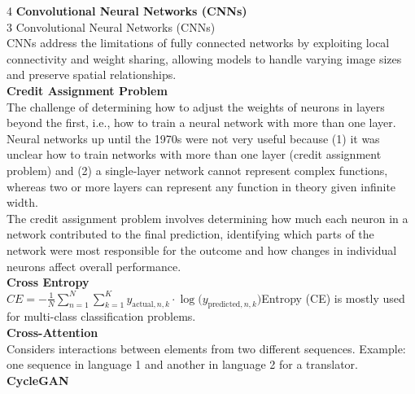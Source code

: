 \documentclass[8pt]{extarticle}
\begin{document}
\begin{multicols}{4}
\vspace{2pt}\textbf{Convolutional Neural Networks (CNNs)}\\
3 Convolutional Neural Networks (CNNs)\\
CNNs address the limitations of fully connected networks by exploiting local connectivity and weight sharing, allowing models to handle varying image sizes and preserve spatial relationships.\\
\vspace{2pt}\textbf{Credit Assignment Problem}\\
The challenge of determining how to adjust the weights of neurons in layers beyond the first, i.e., how to train a neural network with more than one layer.\\
Neural networks up until the 1970s were not very useful because (1) it was unclear how to train networks with more than one layer (credit assignment problem) and (2) a single-layer network cannot represent complex functions, whereas two or more layers can represent any function in theory given infinite width.\\
The credit assignment problem involves determining how much each neuron in a network contributed to the final prediction, identifying which parts of the network were most responsible for the outcome and how changes in individual neurons affect overall performance.\\
\vspace{2pt}\textbf{Cross Entropy}\\
$CE = -\frac{1}{N} \sum_{n=1}^{N} \sum_{k=1}^{K} y_{\text{actual},n,k} \cdot \log\!\bigl(y_{\text{predicted},n,k}\bigr)$\Cross Entropy (CE) is mostly used for multi-class classification problems.\\
\vspace{2pt}\textbf{Cross-Attention}\\
Considers interactions between elements from two different sequences. Example: one sequence in language 1 and another in language 2 for a translator.\\
\vspace{2pt}\textbf{CycleGAN}\\


\end{multicols}
\end{document}
